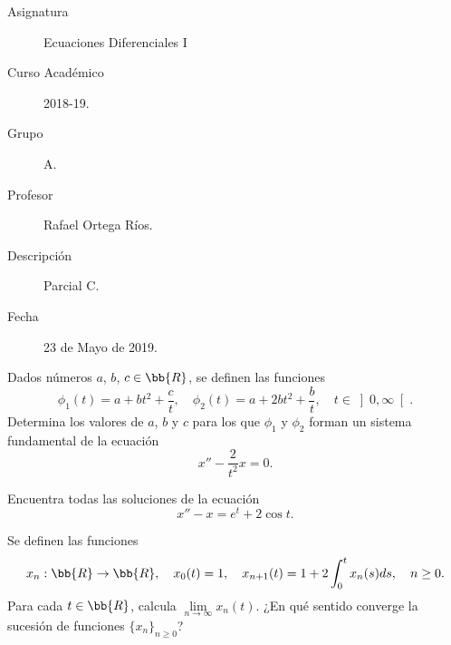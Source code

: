\documentclass[12pt]{article}
\begin{document}

    
    

    \begin{description}
        \item[Asignatura] Ecuaciones Diferenciales I
        \item[Curso Académico] 2018-19.
        \item[Grupo] A.
        \item[Profesor] Rafael Ortega Ríos.
        \item[Descripción] Parcial C.
        \item[Fecha] 23 de Mayo de 2019.
    \end{description}
    \newpage

    \begin{ejercicio}
        Dados números $a$, $b$, $c \in \bb{R}$, se definen las funciones
        \[
            \phi_1(t) = a + bt^2 + \frac{c}{t}, \quad \phi_2(t) = a + 2bt^2 + \frac{b}{t}, \quad t \in\left]0, \infty\right[.
        \]
        Determina los valores de $a$, $b$ y $c$ para los que $\phi_1$ y $\phi_2$ forman un sistema fundamental de la ecuación
        \[
            x'' - \frac{2}{t^2}x = 0.
        \]
    \end{ejercicio}

    \begin{ejercicio}
        Encuentra todas las soluciones de la ecuación
        \[
            x'' - x = e^t + 2\cos t.
        \]
    \end{ejercicio}

    \begin{ejercicio}
        Se definen las funciones
        \[
            x_n : \bb{R} \to \bb{R}, \quad x_0(t) = 1, \quad x_{n+1}(t) = 1 + 2\int_0^t x_n(s)ds, \quad n \geq 0.
        \]
        Para cada $t \in \bb{R}$, calcula $\lim\limits_{n\to\infty} x_n(t)$. ¿En qué sentido converge la sucesión de funciones $\{x_n\}_{n\geq 0}$?
    \end{ejercicio}
\end{document}
